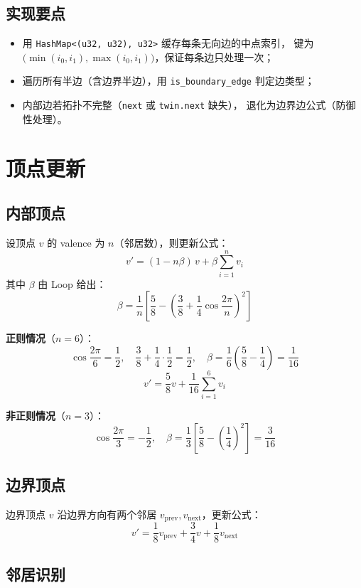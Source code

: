 \documentclass[11pt,a4paper]{article}
\begin{document}
\subsection{实现要点}

\begin{itemize}
  \item 用 \texttt{HashMap<(u32, u32), u32>} 缓存每条无向边的中点索引，
        键为 $\bigl(\min(i_0, i_1), \max(i_0, i_1)\bigr)$，保证每条边只处理一次；
  \item 遍历所有半边（含边界半边），用 \texttt{is\_boundary\_edge} 判定边类型；
  \item 内部边若拓扑不完整（\texttt{next} 或 \texttt{twin.next} 缺失），
        退化为边界边公式（防御性处理）。
\end{itemize}

\section{顶点更新}

\subsection{内部顶点}

设顶点 $v$ 的 valence 为 $n$（邻居数），则更新公式：
\[
  v' = (1 - n\beta)\, v + \beta \sum_{i=1}^{n} v_i
\]
其中 $\beta$ 由 Loop 给出：
\[
  \beta = \frac{1}{n}\left[\frac{5}{8} - \left(\frac{3}{8} + \frac{1}{4}\cos\frac{2\pi}{n}\right)^{\!2}\right]
\]

\textbf{正则情况}（$n = 6$）：
\[
  \cos\frac{2\pi}{6} = \frac{1}{2}, \quad
  \frac{3}{8} + \frac{1}{4}\cdot\frac{1}{2} = \frac{1}{2}, \quad
  \beta = \frac{1}{6}\left(\frac{5}{8} - \frac{1}{4}\right) = \frac{1}{16}
\]
\[
  v' = \frac{5}{8}v + \frac{1}{16}\sum_{i=1}^{6} v_i
\]

\textbf{非正则情况}（$n = 3$）：
\[
  \cos\frac{2\pi}{3} = -\frac{1}{2}, \quad
  \beta = \frac{1}{3}\left[\frac{5}{8} - \left(\frac{1}{4}\right)^{\!2}\right] = \frac{3}{16}
\]

\subsection{边界顶点}

边界顶点 $v$ 沿边界方向有两个邻居 $v_{\text{prev}}, v_{\text{next}}$，更新公式：
\[
  v' = \frac{1}{8}v_{\text{prev}} + \frac{3}{4}v + \frac{1}{8}v_{\text{next}}
\]

\subsection{邻居识别}
\end{document}
